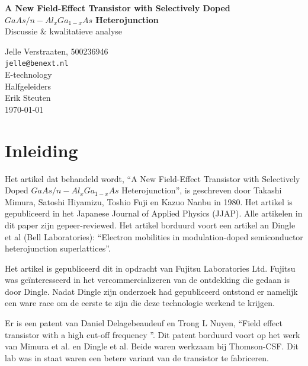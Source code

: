 \documentclass[11pt]{article}
\newlength{\leftbarwidth}
\newlength{\leftbarsep}
\newcommand*{\leftbarcolorcmd}{\color{leftbarcolor}}%
\renewenvironment{leftbar}{%
    \def\FrameCommand{{\leftbarcolorcmd{\vrule width \leftbarwidth\relax\hspace {\leftbarsep}}}}%
    \MakeFramed {\advance \hsize -\width \FrameRestore }}{\endMakeFramed}
\begin{document}
\begin{titlepage}
\begin{center}
{\huge\bfseries A New Field-Effect Transistor with Selectively Doped $GaAs/n-Al_{x}Ga_{1-x}As$ Heterojunction}
\\ \bigskip
{\Large Discussie \& kwalitatieve analyse}
\end{center}
\vfill
\begin{flushleft}
\setlength{\leftbarwidth}{1pt}
\begin{leftbar}
Jelle Verstraaten, 500236946 \\
\texttt{jelle@benext.nl} \\
E-technology \\
Halfgeleiders \\
Erik Steuten\\
{\small \today} \\
\end{leftbar}
\end{flushleft}
\end{titlepage}

\newpage
\tableofcontents
\newpage

\section{Inleiding}

Het artikel dat behandeld wordt, ``A New Field-Effect Transistor with Selectively Doped $GaAs/n-Al_{x}Ga_{1-x}As$ Heterojunction'', is geschreven door Takashi Mimura, Satoshi Hiyamizu, Toshio Fuji en Kazuo Nanbu in 1980. Het artikel is gepubliceerd in het Japanese Journal of Applied Physics (JJAP). Alle artikelen in dit paper zijn gepeer-reviewed. Het artikel borduurd voort een artikel an Dingle et al (Bell Laboratories): ``Electron mobilities in modulation-doped semiconductor heterojunction superlattices''.

Het artikel is gepubliceerd dit in opdracht van Fujitsu Laboratories Ltd. Fujitsu was ge\"interesseerd in het vercommercializeren van de ontdekking die gedaan is door Dingle. Nadat Dingle zijn onderzoek had gepubliceerd ontstond er namelijk een ware race om de eerste te zijn die deze technologie werkend te krijgen.

Er is een patent van Daniel Delagebeaudeuf en Trong L Nuyen, ``Field effect transistor with a high cut-off frequency ''. Dit patent borduurd voort op het werk van Mimura et al. en Dingle et al. Beide waren werkzaam bij Thomson-CSF. Dit lab was in staat waren een betere variant van de transistor te fabriceren. 
\end{document}
